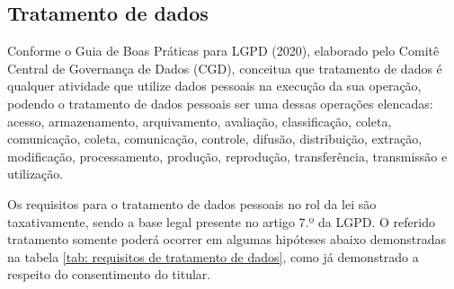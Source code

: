 \documentclass[
	12pt,				%
	openright,			%
	oneside,			%
	a4paper,			%
	english,			%
	french,				%
	spanish,			%
	brazil,				%
	]{abntex2}
\begin{document}
\subsection{Tratamento de dados}

Conforme o Guia de Boas Práticas para LGPD (2020), elaborado pelo Comitê Central de Governança de Dados (CGD), conceitua que tratamento de dados é qualquer atividade que utilize dados pessoais na execução da sua operação, podendo o tratamento de dados pessoais ser uma dessas operações elencadas: acesso, armazenamento, arquivamento, avaliação, classificação, coleta, comunicação, coleta, comunicação, controle, difusão, distribuição, extração, modificação, processamento, produção, reprodução, transferência, transmissão e utilização.

Os requisitos para o tratamento de dados pessoais no rol da lei são taxativamente, sendo a base legal presente no artigo 7.º da LGPD. O referido tratamento somente poderá ocorrer em algumas hipóteses abaixo demonstradas na tabela \ref{tab: requisitos de tratamento de dados}, como já demonstrado a respeito do consentimento do titular.
\end{document}
